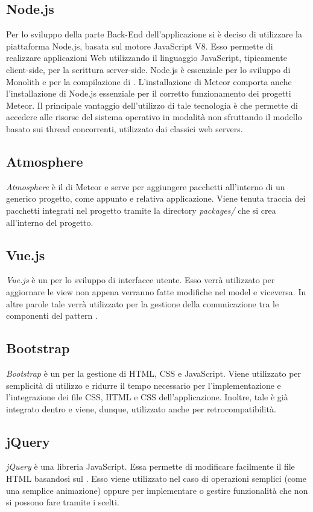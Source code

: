 \subsection{Node.js}
Per lo sviluppo della parte Back-End dell’applicazione si è deciso di utilizzare la piattaforma  Node.js, basata sul motore JavaScript V8. Esso permette di realizzare applicazioni
Web utilizzando il linguaggio JavaScript, tipicamente client-side, per
la scrittura server-side. 
Node.js è essenziale per lo sviluppo di Monolith e per la compilazione di . L'installazione di Meteor comporta anche l'installazione di Node.js essenziale per il corretto funzionamento dei progetti Meteor. Il principale vantaggio dell'utilizzo di tale tecnologia è che permette di accedere alle risorse del sistema operativo in modalità  non sfruttando il modello basato sui thread concorrenti, utilizzato dai classici web servers.

\subsection{Atmosphere}
\textit{Atmosphere} è il  di Meteor e serve per aggiungere pacchetti  all'interno di un generico progetto, come appunto  e relativa applicazione. Viene tenuta traccia dei pacchetti integrati nel progetto tramite la directory \textit{packages/} che si crea all'interno del progetto.

\subsection{Vue.js}
\textit{Vue.js} è un  per lo sviluppo di interfacce utente. Esso verrà utilizzato per aggiornare le view non appena verranno fatte modifiche nel model e viceversa. In altre parole tale  verrà utilizzato per la gestione della comunicazione tra le componenti del pattern .

\subsection{Bootstrap}
\textit{Bootstrap} è un  per la gestione di HTML, CSS e JavaScript. Viene utilizzato per semplicità di utilizzo e ridurre il tempo necessario per l'implementazione e l'integrazione dei file CSS, HTML e CSS dell'applicazione. Inoltre, tale  è già integrato dentro  e viene, dunque, utilizzato anche per retrocompatibilità.

\subsection{jQuery}
\textit{jQuery} è una libreria JavaScript. Essa permette di modificare facilmente il file HTML basandosi sul . Esso viene utilizzato nel caso di operazioni semplici (come una semplice animazione) oppure per implementare o gestire funzionalità che non si possono fare tramite i  scelti.